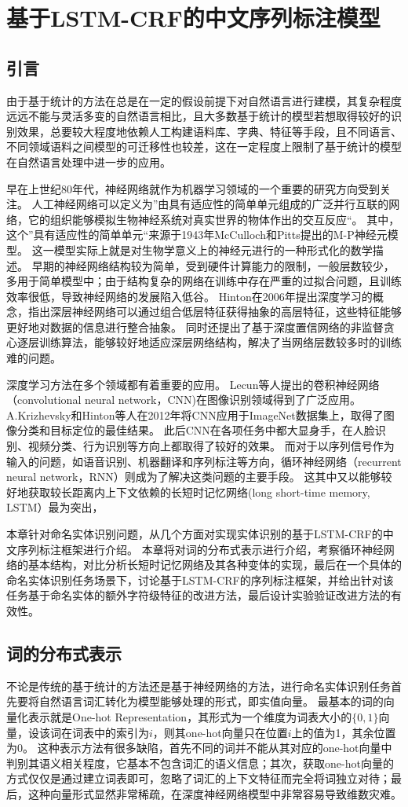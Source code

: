 \chapter{基于LSTM-CRF的中文序列标注模型}
\section{引言}
由于基于统计的方法在总是在一定的假设前提下对自然语言进行建模，其复杂程度远远不能与灵活多变的自然语言相比，且大多数基于统计的模型若想取得较好的识别效果，总要较大程度地依赖人工构建语料库、字典、特征等手段，且不同语言、不同领域语料之间模型的可迁移性也较差，这在一定程度上限制了基于统计的模型在自然语言处理中进一步的应用。

早在上世纪80年代，神经网络就作为机器学习领域的一个重要的研究方向受到关注。
人工神经网络可以定义为”由具有适应性的简单单元组成的广泛并行互联的网络，它的组织能够模拟生物神经系统对真实世界的物体作出的交互反应“。
其中，这个”具有适应性的简单单元“来源于1943年McCulloch和Pitts提出的M-P神经元模型。
这一模型实际上就是对生物学意义上的神经元进行的一种形式化的数学描述。
早期的神经网络结构较为简单，受到硬件计算能力的限制，一般层数较少，多用于简单模型中；由于结构复杂的网络在训练中存在严重的过拟合问题，且训练效率很低，导致神经网络的发展陷入低谷。
Hinton在2006年提出深度学习的概念，指出深层神经网络可以通过组合低层特征获得抽象的高层特征，这些特征能够更好地对数据的信息进行整合抽象。
同时还提出了基于深度置信网络的非监督贪心逐层训练算法，能够较好地适应深层网络结构，解决了当网络层数较多时的训练难的问题。

深度学习方法在多个领域都有着重要的应用。
Lecun等人提出的卷积神经网络（convolutional neural network，CNN)在图像识别领域得到了广泛应用。
A.Krizhevsky和Hinton等人在2012年将CNN应用于ImageNet数据集上，取得了图像分类和目标定位的最佳结果。
此后CNN在各项任务中都大显身手，在人脸识别、视频分类、行为识别等方向上都取得了较好的效果。
而对于以序列信号作为输入的问题，如语音识别、机器翻译和序列标注等方向，循环神经网络（recurrent neural network，RNN）则成为了解决这类问题的主要手段。
这其中又以能够较好地获取较长距离内上下文依赖的长短时记忆网络(long short-time memory, LSTM）最为突出，

本章针对命名实体识别问题，从几个方面对实现实体识别的基于LSTM-CRF的中文序列标注框架进行介绍。
本章将对词的分布式表示进行介绍，考察循环神经网络的基本结构，对比分析长短时记忆网络及其各种变体的实现，最后在一个具体的命名实体识别任务场景下，讨论基于LSTM-CRF的序列标注框架，并给出针对该任务基于命名实体的额外字符级特征的改进方法，最后设计实验验证改进方法的有效性。

\section{词的分布式表示}
不论是传统的基于统计的方法还是基于神经网络的方法，进行命名实体识别任务首先要将自然语言词汇转化为模型能够处理的形式，即实值向量。
最基本的词的向量化表示就是One-hot Representation，其形式为一个维度为词表大小的$\{0, 1\}$向量，设该词在词表中的索引为$i$，则其one-hot向量只在位置$i$上的值为1，其余位置为0。
这种表示方法有很多缺陷，首先不同的词并不能从其对应的one-hot向量中判别其语义相关程度，它基本不包含词汇的语义信息；其次，获取one-hot向量的方式仅仅是通过建立词表即可，忽略了词汇的上下文特征而完全将词独立对待；最后，这种向量形式显然非常稀疏，在深度神经网络模型中非常容易导致维数灾难。

